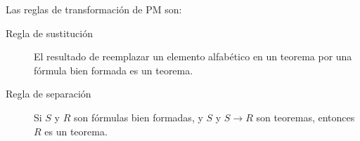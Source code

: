 Las reglas de transformación de PM son:

\begin{description}
  \item[Regla de sustitución] El resultado de reemplazar un elemento
    alfabético en un teorema por una fórmula bien formada es un teorema.

  \item[Regla de separación] Si $S$ y $R$ son fórmulas bien formadas, y $S$
    y $S \to R$ son teoremas, entonces $R$ es un teorema.
\end{description}











